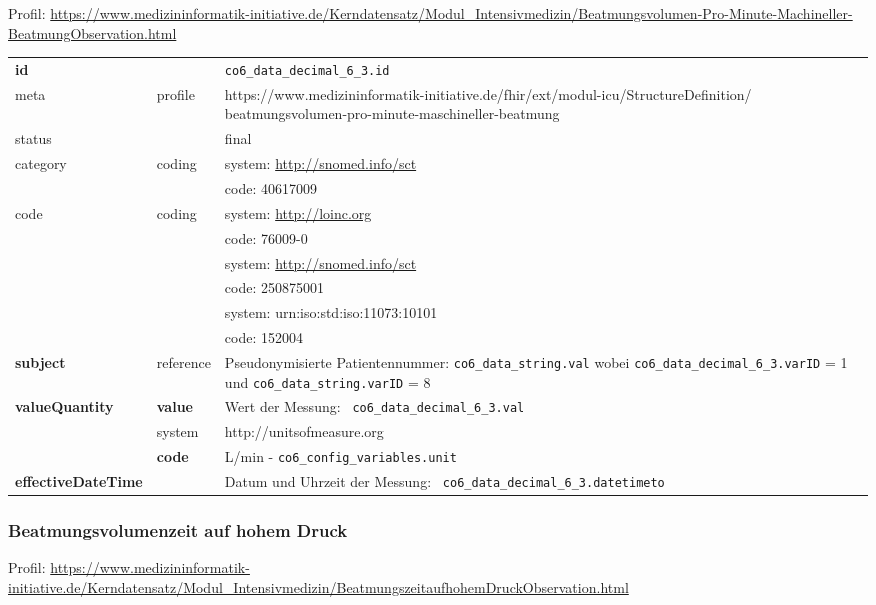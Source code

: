 Profil: \url{https://www.medizininformatik-initiative.de/Kerndatensatz/Modul_Intensivmedizin/Beatmungsvolumen-Pro-Minute-Machineller-BeatmungObservation.html}

\begin{longtable}{|l|l|p{7.5cm}|}
        \hline
        \rowcolor{lightgray} \multicolumn{3}{|l|}{Data Mapping (inhaltlich)} \\ \hline
        \textbf{id} &  & \texttt{co6\_data\_decimal\_6\_3.id} \\ \hline
	meta & profile & https://www.medizininformatik-initiative.de/fhir/ext/modul-icu/StructureDefinition/ beatmungsvolumen-pro-minute-maschineller-beatmung \\ \hline 
	status &  & final   \\ \hline 
	category & coding & system: \url{http://snomed.info/sct} \\
\cline{3-3}
	& & code: 40617009 \\ \hline
	code & coding & system: \url{http://loinc.org} \\ 
	\cline{3-3} 
	&  & code: 76009-0 \\ 
	\cline{3-3} 
	&  & system: \url{http://snomed.info/sct} \\ 
	\cline{3-3} 
	&  & code: 250875001 \\ 
	\cline{3-3} 
	&  & system: urn:iso:std:iso:11073:10101 \\ 
	\cline{3-3}
	&  & code: 152004 \\ \hline
	\textbf{subject} & reference & Pseudonymisierte Patientennummer: \texttt{co6\_data\_string.val} wobei \texttt{co6\_data\_decimal\_6\_3.varID} = 1 und \texttt{co6\_data\_string.varID} = 8 \\ \hline
	 \textbf{valueQuantity}  & \textbf{value} & Wert der Messung: \texttt{
co6\_data\_decimal\_6\_3.val} \\
        \cline{2-3}
         & system & http://unitsofmeasure.org \\
         \cline{2-3}
         & \textbf{code} &
L/min - \texttt{co6\_config\_variables.unit}
\\ \hline
     \textbf{effectiveDateTime}  & & Datum und Uhrzeit der Messung: \texttt{
co6\_data\_decimal\_6\_3.datetimeto} \\
     \hline
\end{longtable}

\subsubsection{Beatmungsvolumenzeit auf hohem Druck} 
Profil: \url{https://www.medizininformatik-initiative.de/Kerndatensatz/Modul_Intensivmedizin/BeatmungszeitaufhohemDruckObservation.html}

